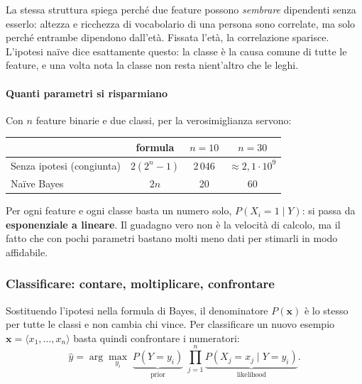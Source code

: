 \documentclass[12pt]{extarticle}
\begin{document}
\noindent La stessa struttura spiega perché due feature possono \emph{sembrare} dipendenti senza esserlo: altezza e ricchezza di vocabolario di una persona sono correlate, ma solo perché entrambe dipendono dall'età. Fissata l'età, la correlazione sparisce. L'ipotesi naïve dice esattamente questo: la classe è la causa comune di tutte le feature, e una volta nota la classe non resta nient'altro che le leghi.

\paragraph{Quanti parametri si risparmiano}
Con $n$ feature binarie e due classi, per la verosimiglianza servono:
\begin{center}
\small
\begin{tabular}{lccc}
    \toprule
    & \textbf{formula} & $n = 10$ & $n = 30$ \\
    \midrule
    Senza ipotesi (congiunta) & $2(2^n - 1)$ & 2\,046 & $\approx 2{,}1 \cdot 10^9$ \\
    Naïve Bayes & $2n$ & 20 & 60 \\
    \bottomrule
\end{tabular}
\end{center}
Per ogni feature e ogni classe basta un numero solo, $P(X_i=1\mid Y)$: si passa da \textbf{esponenziale a lineare}. Il guadagno vero non è la velocità di calcolo, ma il fatto che con pochi parametri bastano molti meno dati per stimarli in modo affidabile.

\subsubsection{Classificare: contare, moltiplicare, confrontare}

\noindent Sostituendo l'ipotesi nella formula di Bayes, il denominatore $P(\mathbf{x})$ è lo stesso per tutte le classi e non cambia chi vince. Per classificare un nuovo esempio $\mathbf{x}=\langle x_1,\dots,x_n\rangle$ basta quindi confrontare i numeratori:
\[
\hat y = \arg\max_{y_i}\; \underbrace{P(Y=y_i)}_{\text{prior}}\;\prod_{j=1}^n \underbrace{P(X_j=x_j\mid Y=y_i)}_{\text{likelihood}} .
\]
\end{document}
